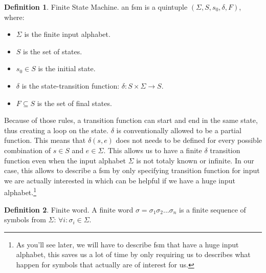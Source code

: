 \documentclass[12pt]{article}
\theoremstyle{definition}
\newtheorem{definition}{Definition}[section]
\theoremstyle{definition}
\theoremstyle{remark}
\newcommand{\A}{\mathcal{A}}
\begin{document}
\theoremstyle{definition}
\begin{definition}{Finite State Machine.} an \gls{fsm} is a quintuple $(\Sigma, S, s_{0},\delta, F)$, where:
\begin{itemize}
\item $\Sigma$ is the finite input alphabet.
\item $S$ is the set of states.
\item $s_{0} \in S$ is the initial state.
\item $\delta$ is the state-transition function: $\delta: S \times \Sigma \to S$.
\item $F \subseteq S$ is the set of final states.
\end{itemize}
\end{definition}

Because of those rules, a transition function can start and end in the same state, thus creating a loop on the state. $\delta$ is conventionally allowed to be a partial function. This means that $\delta(s, e)$ does not needs to be defined for every possible combination of $s \in S$ and $e \in \Sigma$. This allows us to have a finite $\delta$ transition function even when the input alphabet $\Sigma$ is not totaly known or infinite. In our case, this allows to describe a \gls{fsm} by only specifying transition function for input we are actually interested in which can be helpful if we have a huge input alphabet.\footnote{As you'll see later, we will have to describe \gls{fsm} that have a huge input alphabet, this saves us a lot of time by only requiring us to describes what happen for symbols that actually are of interest for us.}


\theoremstyle{definition}
\begin{definition}{Finite word.} A finite word $\sigma = \sigma_1 \sigma_2 ... \sigma_n$ is a finite sequence of symbols from $\Sigma$: $\forall i: \sigma_i \in \Sigma$.
\end{definition}

\end{document}
